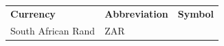 {{    \addtocounter{footnote}{-0}
    
          }{ %
        
    
        \begin{center}
      
      \label{m39335*uid2}
      
    \noindent
      \tablelasttail{}
      \begin{xtabular}[t]{|l|l|l|}\hline
    
    
        
                  \textbf{Currency}
                 &
    
    
        
                  \textbf{Abbreviation}
                 &
    
    
        
                  \textbf{Symbol}
     \tabularnewline{}
    
    
        South African Rand &
    
    
        ZAR &
    

\end{xtabular}
\end{center}}}
